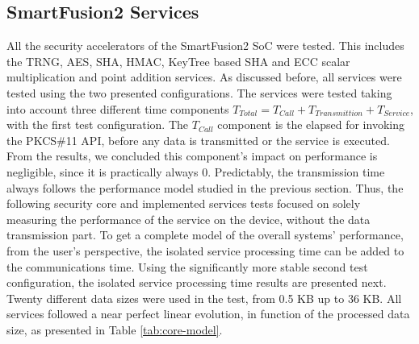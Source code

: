\subsection{SmartFusion2 Services}\label{chap:evaluation:board}


All the security accelerators of the SmartFusion2 SoC were tested. This includes the TRNG, AES, SHA, HMAC, KeyTree based SHA and ECC scalar multiplication and point addition services.
As discussed before, all services were tested using the two presented configurations. The services were tested taking into account three different time components \(T_{Total} = T_{Call} + T_{Transmittion} + T_{Service}\), with the first test configuration. The \(T_{Call}\) component is the elapsed for invoking the PKCS\#11 API, before any data is transmitted or the service is executed. From the results, we concluded this component's impact on performance is negligible, since it is practically always 0.
Predictably, the transmission time always follows the performance model studied in the previous section.
Thus, the following security core and implemented services tests focused on solely measuring the performance of the service on the device, without the data transmission part. To get a complete model of the overall systems' performance, from the user's perspective, the isolated service processing time can be added to the communications time.
Using the significantly more stable second test configuration, the isolated service processing time results are presented next.
Twenty different data sizes were used in the test, from 0.5 KB up to 36 KB.
All services followed a near perfect linear evolution, in function of the processed data size, as presented in Table \ref{tab:core-model}.




